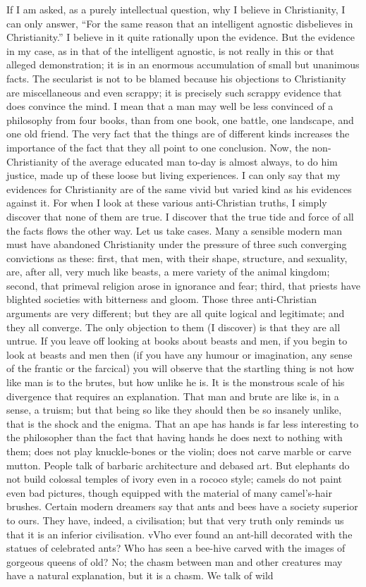 \documentclass{book}
\begin{document}
If I am asked, as a purely intellectual question, why I believe in Christianity, I can only answer, “For the same reason that an intelligent agnostic disbelieves in Christianity.” I believe in it quite rationally upon the evidence. But the evidence in my case, as in that of the intelligent agnostic, is not really in this or that alleged demonstration; it is in an enormous accumulation of small but unanimous facts. The secularist is not to be blamed because his objections to Christianity are miscellaneous and even scrappy; it is precisely such scrappy evidence that does convince the mind. I mean that a man may well be less convinced of a philosophy from four books, than from one book, one battle, one landscape, and one old friend. The very fact that the things are of different kinds increases the importance of the fact that they all point to one conclusion. Now, the non-Christianity of the average educated man to-day is almost always, to do him justice, made up of these loose but living experiences. I can only say that my evidences for Christianity are of the same vivid but varied kind as his evidences against it. For when I look at these various anti-Christian truths, I simply discover that none of them are true. I discover that the true tide and force of all the facts flows the other way. Let us take cases. Many a sensible modern man must have abandoned Christianity under the pressure of three such converging convictions as these: first, that men, with their shape, structure, and sexuality, are, after all, very much like beasts, a mere variety of the animal kingdom; second, that primeval religion arose in ignorance and fear; third, that priests have blighted societies with bitterness and gloom. Those three anti-Christian arguments are very different; but they are all quite logical and legitimate; and they all converge. The only objection to them (I discover) is that they are all untrue. If you leave off looking at books about beasts and men, if you begin to look at beasts and men then (if you have any humour or imagination, any sense of the frantic or the farcical) you will observe that the startling thing is not how like man is to the brutes, but how unlike he is. It is the monstrous scale of his divergence that requires an explanation. That man and brute are like is, in a sense, a truism; but that being so like they should then be so insanely unlike, that is the shock and the enigma. That an ape has hands is far less interesting to the philosopher than the fact that having hands he does next to nothing with them; does not play knuckle-bones or the violin; does not carve marble or carve mutton. People talk of barbaric architecture and debased art. But elephants do not build colossal temples of ivory even in a rococo style; camels do not paint even bad pictures, though equipped with the material of many camel’s-hair brushes. Certain modern dreamers say that ants and bees have a society superior to ours. They have, indeed, a civilisation; but that very truth only reminds us that it is an inferior civilisation. vVho ever found an ant-hill decorated with the statues of celebrated ants? Who has seen a bee-hive carved with the images of gorgeous queens of old? No; the chasm between man and other creatures may have a natural explanation, but it is a chasm. We talk of wild 
\end{document}
